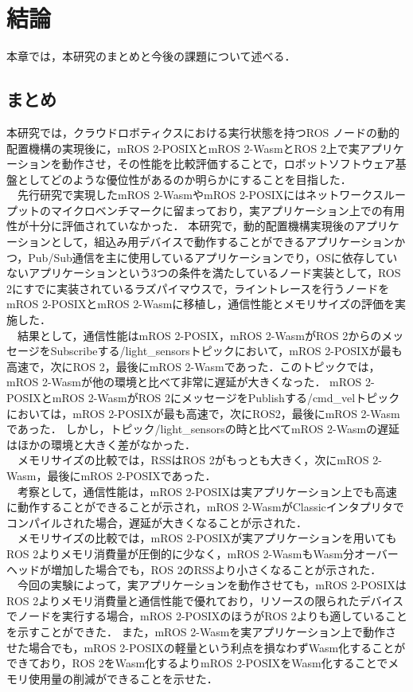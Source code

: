 \chapter{結論}
本章では，本研究のまとめと今後の課題について述べる．
\section{まとめ}
本研究では，クラウドロボティクスにおける実行状態を持つROS ノードの動的配置機構の実現後に，mROS 2-POSIXとmROS 2-WasmとROS 2上で実アプリケーションを動作させ，その性能を比較評価することで，ロボットソフトウェア基盤としてどのような優位性があるのか明らかにすることを目指した．
\\　先行研究で実現したmROS 2-WasmやmROS 2-POSIXにはネットワークスループットのマイクロベンチマークに留まっており，実アプリケーション上での有用性が十分に評価されていなかった．
本研究で，動的配置機構実現後のアプリケーションとして，組込み用デバイスで動作することができるアプリケーションかつ，Pub/Sub通信を主に使用しているアプリケーションでり，OSに依存していないアプリケーションという3つの条件を満たしているノード実装として，ROS 2にすでに実装されているラズパイマウスで，ライントレースを行うノードをmROS 2-POSIXとmROS 2-Wasmに移植し，通信性能とメモリサイズの評価を実施した．
\\　結果として，通信性能はmROS 2-POSIX，mROS 2-WasmがROS 2からのメッセージをSubscribeする/light\_sensorsトピックにおいて，mROS 2-POSIXが最も高速で，次にROS 2，最後にmROS 2-Wasmであった．このトピックでは，mROS 2-Wasmが他の環境と比べて非常に遅延が大きくなった．
mROS 2-POSIXとmROS 2-WasmがROS 2にメッセージをPublishする/cmd\_velトピックにおいては，mROS 2-POSIXが最も高速で，次にROS2，最後にmROS 2-Wasmであった．
しかし，トピック/light\_sensorsの時と比べてmROS 2-Wasmの遅延はほかの環境と大きく差がなかった．
\\　メモリサイズの比較では，RSSはROS 2がもっとも大きく，次にmROS 2-Wasm，最後にmROS 2-POSIXであった．
\\　考察として，通信性能は，mROS 2-POSIXは実アプリケーション上でも高速に動作することができることが示され，mROS 2-WasmがClassicインタプリタでコンパイルされた場合，遅延が大きくなることが示された．
\\　メモリサイズの比較では，mROS 2-POSIXが実アプリケーションを用いてもROS 2よりメモリ消費量が圧倒的に少なく，mROS 2-WasmもWasm分オーバーヘッドが増加した場合でも，ROS 2のRSSより小さくなることが示された．
\\　今回の実験によって，実アプリケーションを動作させても，mROS 2-POSIXはROS 2よりメモリ消費量と通信性能で優れており，リソースの限られたデバイスでノードを実行する場合，mROS 2-POSIXのほうがROS 2よりも適していることを示すことができた．
また，mROS 2-Wasmを実アプリケーション上で動作させた場合でも，mROS 2-POSIXの軽量という利点を損なわずWasm化することができており，ROS 2をWasm化するよりmROS 2-POSIXをWasm化することでメモリ使用量の削減ができることを示せた．

